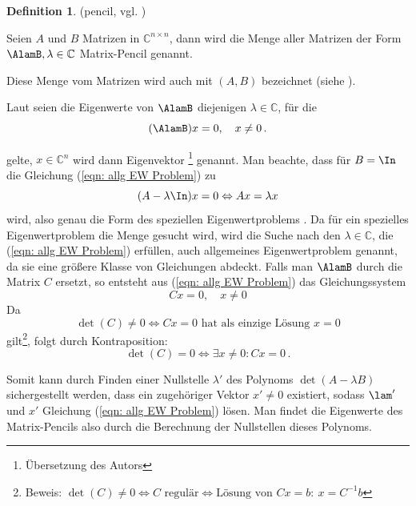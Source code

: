 \documentclass[a4paper,12pt]{report}
\newcommand{\C}{\mathbb C}
\newcommand{\zitat}[1]{\glqq #1\grqq}
\newcommand{\inv}{^{-1}}
\newcommand{\1}{\mathds{1}}
\theoremstyle{plain} %
\theoremstyle{definition} %
\newtheorem{definition}[theorem]{Definition}
\theoremstyle{remark}
\begin{document}
            \begin{definition}(pencil, vgl. \cite[S. 375]{matrixGolub})
                  \label{def: pencil}

                  Seien $A$ und $B$ Matrizen in $\C^{n\times n}$, dann wird die Menge aller Matrizen der Form
                  $\AlamB, \lambda \in \C$ Matrix-Pencil genannt.
            \end{definition}

            Diese Menge vom Matrizen wird auch mit $(A, B)$ bezeichnet (siehe \cite[S. 373]{regularMatrixPencil}).

            Laut \cite[S. 375]{matrixGolub} seien die Eigenwerte von $\AlamB$ diejenigen $\lambda \in\C$, für die
            \begin{equation}
                  \label{eqn: allg EW Problem}
                  (\AlamB)x=0,\quad x\ne 0\, .
            \end{equation}
            
            gelte, $x\in\C^n$ wird dann \zitat{Eigenvektor} \cite[S. 375]{matrixGolub}\footnote{Übersetzung des Autors} genannt.
            Man beachte, dass für $B=\In$ die Gleichung (\ref{eqn: allg EW Problem}) zu
            $$(A-\lambda\In)x=0 \Leftrightarrow Ax = \lambda x$$
            wird, also genau die Form des \zitat{speziellen Eigenwertproblems} \cite[S. 381]{maschinendynamikDresig}.
            Da für ein spezielles Eigenwertproblem die Menge \lamA gesucht wird,
            wird die Suche nach den $\lambda\in\C$, die (\ref{eqn: allg EW Problem}) erfüllen,
            auch \zitat{allgemeines Eigenwertproblem} \cite[S. 380]{maschinendynamikDresig} genannt, da sie eine größere Klasse von Gleichungen abdeckt.
            Falls man $\AlamB$ durch die Matrix $C$ ersetzt, so entsteht aus (\ref{eqn: allg EW Problem}) das Gleichungssystem
            $$Cx=0,\quad x\ne 0$$
            Da
            $$\det(C)\ne 0 \Leftrightarrow Cx=0 \text{ hat als einzige Lösung }x=0$$
            gilt\footnote{Beweis: $\det(C)\ne 0 \Leftrightarrow C \text{ regulär} \Leftrightarrow \text{Lösung von }Cx=b:\ x=C\inv b$}, folgt durch Kontraposition:
            $$\det(C)=0 \Leftrightarrow \exists x\ne 0: Cx=0\, .$$
            
            Somit kann durch Finden einer Nullstelle $\lambda'$ des Polynoms $\det(A-\lambda B)$ sichergestellt werden, dass ein zugehöriger Vektor $x'\ne 0$ existiert,
            sodass $\lam'$ und $x'$ Gleichung (\ref{eqn: allg EW Problem}) lösen.
            Man findet die Eigenwerte des Matrix-Pencils also durch die Berechnung der Nullstellen dieses Polynoms.
\end{document}

